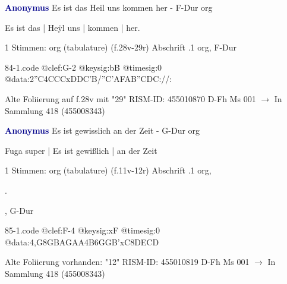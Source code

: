 \documentclass[twocolumn]{book}
\begin{document}
\newline \par \vspace{7pt} \textcolor{darkblue}{\textbf{Anonymus  }}
\newline Es ist das Heil uns kommen her - F-Dur
\newline org
\newline \begin{itshape}[f.28v, at left:] Es ist das | Heÿl uns | kommen | her.\end{itshape} 
\newline \textcolor{darkblue}{}  1 Stimmen: org (tabulature)  (f.28v-29r)
\newline Abschrift
.1  org, F-Dur  
\begin{filecontents*}{84-1.code}
@clef:G-2
@keysig:bB
@timesig:0
@data:2''C4CCCxDDC'B/''C'AFAB''CDC://:
\end{filecontents*}
\newline
%
\newline Alte Foliierung auf f.28v mit "29"
\newline RISM-ID: 455010870
\newline D-Fh  Ms 001
\newline $\rightarrow$ In Sammlung 418 (455008343)
      
\newline \par \vspace{7pt} \textcolor{darkblue}{\textbf{Anonymus  }}
\newline Es ist gewisslich an der Zeit - G-Dur
\newline org
\newline \begin{itshape}[f.11v, at left:] Fuga super | Es ist gewißlich | an der Zeit\end{itshape} 
\newline \textcolor{darkblue}{}  1 Stimmen: org (tabulature)  (f.11v-12r)
\newline Abschrift
.1  org, \begin{itshape}.\end{itshape}, G-Dur  
\begin{filecontents*}{85-1.code}
@clef:F-4
@keysig:xF
@timesig:0
@data:4,G{8GB}{AGAA}4B{6GGB'xC}{8DECD}
\end{filecontents*}
\newline
%
\newline Alte Foliierung vorhanden: "12"
\newline RISM-ID: 455010819
\newline D-Fh  Ms 001
\newline $\rightarrow$ In Sammlung 418 (455008343)
      
\end{document}
